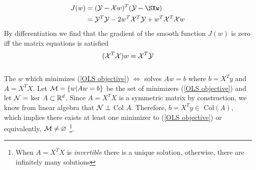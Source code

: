 \begin{align*}
    J(w) &= (\SY -\SX w)^T(\SY - \SXw) \\
    &= \SY^T \SY -2w^T \SX^T \SY + w^T\SX^T \SX w
\end{align*}
By differentiation we find that the gradient of the smooth function $J(w)$ is zero iff the matrix equations is satisfied
$$
(\mathcal X^T\mathcal X)w  = \mathcal X^T \mathcal Y
$$
\\
The $w$ which minimizes (\ref{OLS objective}) $\Leftrightarrow$ solves $Aw = b$ where $b = X^Ty$ and $A = X^TX$. 
Let $\mathcal M = \{w|Aw =b \}$ be the set of minimizers (\ref{OLS objective}) and let 
$\mathcal N =$ ker $A \subset \mathbb R^d$. Since $A = X^TX$ is a symmetric matrix by construction, we know from linear algebra that $\mathcal N \perp$ Col $A$. Therefore,  $b = X^Ty \in $ Col$(A)$, which implies there exists at least one minimizer to (\ref{OLS objective}) or equivalently, $\mathcal M \neq \varnothing$
\footnote{When $A = X^TX$ is \textit{invertible} there is a unique solution, otherwise, there are infinitely many solutions}.



